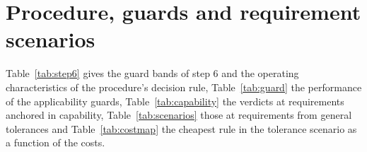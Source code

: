 \documentclass[pdflatex,sn-basic]{sn-jnl}
\begin{document}
\FloatBarrier
\section{Procedure, guards and requirement scenarios}\label{sec:s-procedure}

Table~\ref{tab:step6} gives the guard bands of step 6 and the operating characteristics of the procedure's decision rule, Table~\ref{tab:guard} the performance of the applicability guards, Table~\ref{tab:capability} the verdicts at requirements anchored in capability, Table~\ref{tab:scenarios} those at requirements from general tolerances and Table~\ref{tab:costmap} the cheapest rule in the tolerance scenario as a function of the costs.

\end{document}

